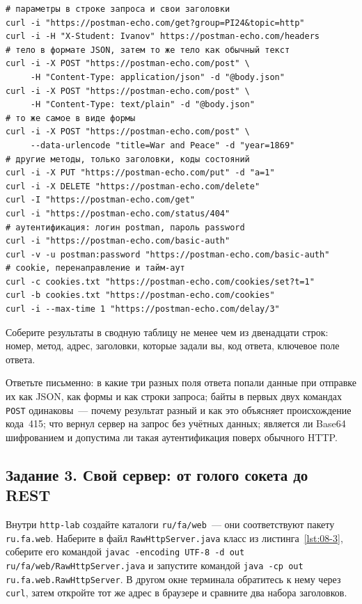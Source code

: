 \begin{listing}[H]
\begin{verbatim}
# параметры в строке запроса и свои заголовки
curl -i "https://postman-echo.com/get?group=PI24&topic=http"
curl -i -H "X-Student: Ivanov" https://postman-echo.com/headers
# тело в формате JSON, затем то же тело как обычный текст
curl -i -X POST "https://postman-echo.com/post" \
     -H "Content-Type: application/json" -d "@body.json"
curl -i -X POST "https://postman-echo.com/post" \
     -H "Content-Type: text/plain" -d "@body.json"
# то же самое в виде формы
curl -i -X POST "https://postman-echo.com/post" \
     --data-urlencode "title=War and Peace" -d "year=1869"
# другие методы, только заголовки, коды состояний
curl -i -X PUT "https://postman-echo.com/put" -d "a=1"
curl -i -X DELETE "https://postman-echo.com/delete"
curl -I "https://postman-echo.com/get"
curl -i "https://postman-echo.com/status/404"
# аутентификация: логин postman, пароль password
curl -i "https://postman-echo.com/basic-auth"
curl -v -u postman:password "https://postman-echo.com/basic-auth"
# cookie, перенаправление и тайм-аут
curl -c cookies.txt "https://postman-echo.com/cookies/set?t=1"
curl -b cookies.txt "https://postman-echo.com/cookies"
curl -i --max-time 1 "https://postman-echo.com/delay/3"
\end{verbatim}
\caption{Серия запросов к эхо-серверу}
\label{lst:08-7}
\end{listing}

Соберите результаты в сводную таблицу не менее чем из двенадцати строк: номер,
метод, адрес, заголовки, которые задали вы, код ответа, ключевое поле ответа.

Ответьте письменно: в какие три разных поля ответа попали данные при отправке
их как JSON, как формы и как строки запроса; байты в первых двух командах
\texttt{POST} одинаковы~--- почему результат разный и как это объясняет
происхождение кода~415; что вернул сервер на запрос без учётных данных;
является ли Base64 шифрованием и допустима ли такая аутентификация поверх
обычного HTTP.

\subsection*{Задание 3. Свой сервер: от голого сокета до REST}

Внутри \texttt{http-lab} создайте каталоги \texttt{ru/fa/web}~--- они
соответствуют пакету \texttt{ru.fa.web}. Наберите в файл
\texttt{RawHttpServer.java} класс из листинга~\ref{lst:08-3}, соберите его
командой \texttt{javac -encoding UTF-8 -d out ru/fa/web/RawHttpServer.java} и
запустите командой \texttt{java -cp out ru.fa.web.RawHttpServer}. В другом окне
терминала обратитесь к нему через \texttt{curl}, затем откройте тот же адрес в
браузере и сравните два набора заголовков.

